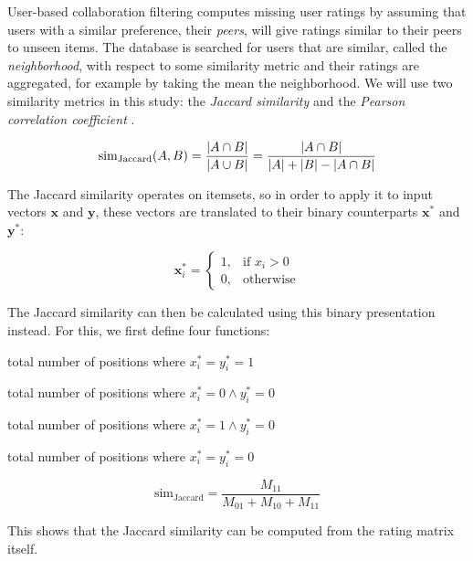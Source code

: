 User-based collaboration filtering computes missing user ratings by assuming that users with a similar preference, their \emph{peers}, will give ratings similar to their peers to unseen items.
The database is searched for users that are similar, called the \emph{neighborhood}, with respect to some similarity metric and their ratings are aggregated, for example by taking the mean the neighborhood.
We will use two similarity metrics in this study: the \emph{Jaccard similarity} \citep{Jaccard1912} and the \emph{Pearson correlation coefficient} \citep{Pearson1895}.

\begin{equation}
	  \mathrm{sim}_{\mathrm{Jaccard}}(A,B) = {{|A \cap B|}\over{|A \cup B|}} = {{|A \cap B|}\over{|A| + |B| - |A \cap B|}}
\end{equation}

The Jaccard similarity operates on itemsets, so in order to apply it to input vectors $\bm{x}$ and $\bm{y}$, these vectors are translated to their binary counterparts $\bm{x}^{*}$ and $\bm{y}^{*}$:

\begin{equation}
	\bm{x}^{*}_{i} =
	\begin{cases}
	    1,& \text{if } x_i > 0 \\
	    0,& \text{otherwise}
	\end{cases}
\end{equation}

The Jaccard similarity can then be calculated using this binary presentation instead.
For this, we first define four functions:

\begin{description}
	\setlength\itemsep{0em}
	\item [$M_{11}$] total number of positions where $x_i^{*}=y_i^*=1$
	\item [$M_{01}$] total number of positions where $x_i^*=0 \land y_i^*=0$
	\item [$M_{10}$] total number of positions where $x_i^*=1 \land y_i^*=0$
	\item [$M_{00}$] total number of positions where $x_i^*=y_i^*=0$
\end{description}

\begin{equation}
	\mathrm{sim}_{\mathrm{Jaccard}}=\frac{M_{11}}{M_{01} + M_{10} + M_{11}}
\end{equation}

This shows that the Jaccard similarity can be computed from the rating matrix itself.

